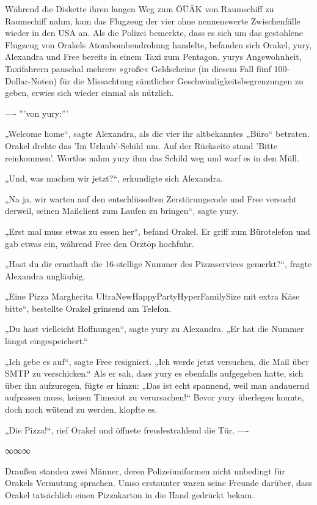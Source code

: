 Während die Diskette ihren langen Weg zum ÖÜÄK von Raumschiff zu Raumschiff nahm, kam das Flugzeug der vier ohne nennenswerte Zwischenfälle wieder in den USA an. Als die Polizei bemerkte, dass es sich um das gestohlene Flugzeug von Orakels Atombombendrohung handelte, befanden sich Orakel, yury, Alexandra und Free bereits in einem Taxi zum Pentagon. yurys Angewohnheit, Taxifahrern pauschal mehrere »große« Geldscheine (in diesem Fall fünf 100-Dollar-Noten) für die Missachtung sämtlicher Geschwindigkeitsbegrenzungen zu geben, erwies sich wieder einmal als nützlich.

----
'''von yury:'''

„Welcome home“, sagte Alexandra, als die vier ihr altbekanntes „Büro“ betraten. Orakel drehte das 'Im Urlaub'-Schild um. Auf der Rückseite stand 'Bitte reinkommen'.
Wortlos nahm yury ihm das Schild weg und warf es in den Müll.

„Und, was machen wir jetzt?“, erkundigte sich Alexandra.

„Na ja, wir warten auf den entschlüsselten Zerstörungscode und Free versucht derweil, seinen Mailclient zum Laufen zu bringen“, sagte yury.

„Erst mal muss etwas zu essen her“, befand Orakel. Er griff zum Bürotelefon und gab etwas ein, während Free den Örztöp hochfuhr.

„Hast du dir ernsthaft die 16-stellige Nummer des Pizzaservices gemerkt?“, fragte Alexandra ungläubig.

„Eine Pizza Margherita UltraNewHappyPartyHyperFamilySize mit extra Käse bitte“, bestellte Orakel grinsend am Telefon.

„Du hast vielleicht Hoffnungen“, sagte yury zu Alexandra. „Er hat die Nummer längst eingespeichert.“

„Ich gebe es auf“, sagte Free resigniert. „Ich werde jetzt versuchen, die Mail über SMTP zu verschicken.“
Als er sah, dass yury es ebenfalls aufgegeben hatte, sich über ihn aufzuregen, fügte er hinzu: „Das ist echt spannend, weil man andauernd aufpassen muss, keinen Timeout zu verursachen!“
Bevor yury überlegen konnte, doch noch wütend zu werden, klopfte es.

„Die Pizza!“, rief Orakel und öffnete freudestrahlend die Tür.
----

\begin{center}
	∞∞∞
\end{center}

Draußen standen zwei Männer, deren Polizeiuniformen nicht unbedingt für Orakels Vermutung sprachen. Umso erstaunter waren seine Freunde darüber, dass Orakel tatsächlich einen Pizzakarton in die Hand gedrückt bekam.


